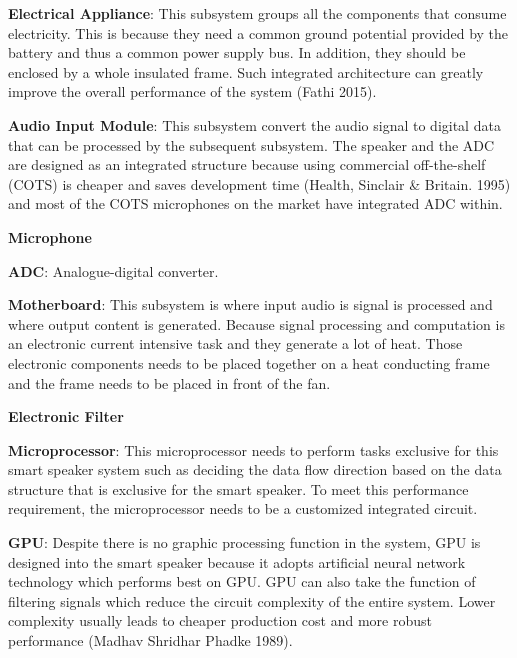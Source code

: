 \documentclass{article}
\begin{document}
\begin{myitems}
  \item \textbf{Electrical Appliance}: This subsystem groups all the components that consume electricity. This is because they need a common ground potential provided by the battery and thus a common power supply bus. In addition, they should be enclosed by a whole insulated frame. Such integrated architecture can greatly improve the overall performance of the system (Fathi 2015).
  \begin{myitems}
  	\item \textbf{Audio Input Module}: This subsystem convert the audio signal to digital data that can be processed by the subsequent subsystem. The speaker and the ADC are designed as an integrated structure because using commercial off-the-shelf (COTS) is cheaper and saves development time (Health, Sinclair \& Britain. 1995) and most of the COTS microphones on the market have integrated ADC within.
  	  \begin{myitems}
  	  \item \textbf{Microphone}
  	  \item \textbf{ADC}: Analogue-digital converter.
  	  \end{myitems}
  	\item \textbf{Motherboard}: This subsystem is where input audio is signal is processed and where output content is generated. Because signal processing and computation is an electronic current intensive task and they generate a lot of heat. Those electronic components needs to be placed together on a heat conducting frame and the frame needs to be placed in front of the fan.
  	\begin{myitems}
  	  \item \textbf{Electronic Filter}
  	  \item \textbf{Microprocessor}: This microprocessor needs to perform tasks exclusive for this smart speaker system such as deciding the data flow direction based on the data structure that is exclusive for the smart speaker. To meet this performance requirement, the microprocessor needs to be a customized integrated circuit.
  	  \item \textbf{GPU}: Despite there is no graphic processing function in the system, GPU is designed into the smart speaker because it adopts artificial neural network technology which performs best on GPU. GPU can also take the function of filtering signals which reduce the circuit complexity of the entire system. Lower complexity usually leads to cheaper production cost and more robust performance (Madhav Shridhar Phadke 1989).

\end{myitems}
\end{myitems}
\end{myitems}
\end{document}
